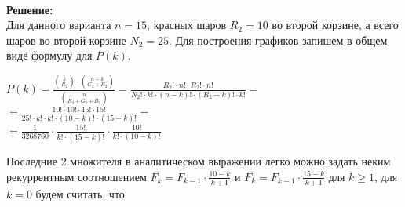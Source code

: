 \documentclass{article}
\begin{document}
\vspace{\baselineskip}
\\
\textbf{Решение:}
\vspace{\baselineskip}
\\
Для данного варианта \begin{math}
n = 15
\end{math}, красных шаров \begin{math}
R_2 = 10
\end{math} во второй корзине, а всего  шаров во второй корзине \begin{math}
N_2 = 25.
\end{math}
Для построения графиков запишем в общем виде формулу для \begin{math}P(k)\end{math}.
\vspace{\baselineskip}
\\
\begin{center}
\begin{math}
P(k) = \displaystyle\frac{\displaystyle{k \choose R_2} \cdot {n-k \choose G_2 + B_2}}{\displaystyle{n \choose R_2 + G_2 + B_2}} = \displaystyle\frac{R_2! \cdot n! \cdot R_2! \cdot n!}{N_2! \cdot k! \cdot (n-k)! \cdot (R_2 - k)! \cdot k!} = 
\end{math}
\vspace{\baselineskip}
\\
\begin{math}
= \displaystyle\frac{10! \cdot 10! \cdot 15! \cdot 15! }{25! \cdot k! \cdot k! \cdot (10 - k)! \cdot (15 - k)!} = 
\end{math}
\vspace{\baselineskip}
\\
\begin{math} =\displaystyle\frac{1}{3268760} \cdot \displaystyle\frac{15!}{k! \cdot (15 - k)!} \cdot \displaystyle\frac{10!}{k! \cdot (10-k)!}
\end{math}
\vspace{\baselineskip}
\\
\end{center}
Последние 2 множителя в аналитическом выражении легко можно задать неким рекуррентным соотношением \begin{math}
 F_{k} = F_{k-1} \cdot \displaystyle\frac{10- k}{k+1} 
\end{math} и \begin{math}
 F_{k} = F_{k-1} \cdot \displaystyle\frac{15- k}{k+1} 
\end{math} для \begin{math}
 k \geq 1
\end{math}, для \begin{math}
 k = 0 
\end{math} будем считать, что 
\end{document}
